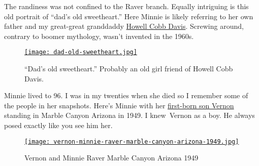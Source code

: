 The randiness was not confined to the Raver branch. Equally intriguing
is this old portrait of ``dad's old sweetheart.'' Here Minnie is likely
referring to her own father and my great-great granddaddy
\href{http://www.findagrave.com/cgi-bin/fg.cgi?page=gr\&GSln=Davis\&GSfn=Howell\&GSmn=C\&GSby=1850\&GSbyrel=after\&GSdy=1950\&GSdyrel=before\&GSst=28\&GScntry=4\&GSob=n\&GRid=67837689\&df=all\&}{Howell
Cobb Davis}. Screwing around, contrary to boomer mythology, wasn't
invented in the 1960s.



\begin{SCfigure}
\centering
\href{http://conceptcontrol.smugmug.com/People/Minnie-Raver/i-GGmLK2W/A}{\texttt{[image: dad-old-sweetheart.jpg]}}
\caption[An old girl friend of Howell Cobb Davis]{``Dad's old sweetheart.'' Probably an old girl friend of Howell Cobb Davis.}
\label{fig:4230X3}
\end{SCfigure}


Minnie lived to 96. I was in my twenties when she died so I remember
some of the people in her snapshots. Here's Minnie with her
\href{http://www.findagrave.com/cgi-bin/fg.cgi?page=gr\&GRid=61581142}{first-born
son Vernon} standing in Marble Canyon Arizona in 1949. I knew~Vernon as
a boy. He always posed exactly like you see him her.



\begin{SCfigure}
\centering
\href{http://conceptcontrol.smugmug.com/People/Minnie-Raver/i-DTmc5Zb/A}{\texttt{[image: vernon-minnie-raver-marble-canyon-arizona-1949.jpg]}}
\caption{Vernon and Minnie Raver Marble Canyon Arizona 1949}
\label{fig:4230X4}
\end{SCfigure}


